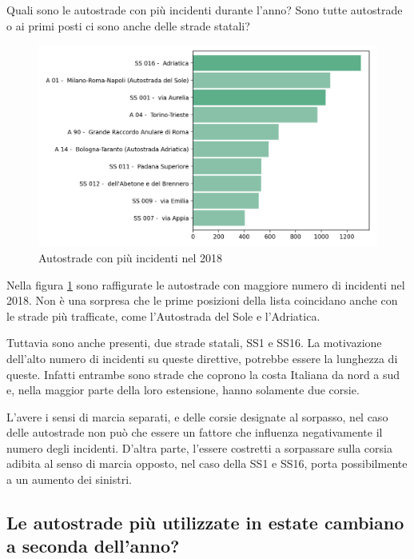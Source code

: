 \documentclass[a4paper,12pt]{report}
\begin{document}
Quali sono le autostrade con più incidenti durante l'anno? 
Sono tutte autostrade o ai primi posti ci sono anche delle strade statali? 

\begin{figure}
    \includegraphics[width=\linewidth]{../src/incidenti/incidenti_aci/autostrade/autostrade.png}
    \caption{Autostrade con più incidenti nel 2018}
    \label{fig:incidenti-autostrade}
\end{figure}

Nella figura \ref{fig:incidenti-autostrade} sono  raffigurate le autostrade con 
maggiore numero di incidenti nel 2018. 
Non è una sorpresa che le prime posizioni della lista coincidano 
anche con le strade più trafficate, come l'Autostrada del Sole e l'Adriatica.

Tuttavia sono anche presenti, due strade statali, SS1 e SS16. 
La motivazione dell'alto numero di incidenti su queste direttive, potrebbe essere 
la lunghezza di queste. Infatti entrambe sono strade che coprono la costa Italiana 
da nord a sud e, nella maggior parte della loro estensione, 
hanno solamente due corsie.

L'avere i sensi di marcia separati, e delle corsie designate al sorpasso, nel caso 
delle autostrade non può che essere un fattore che influenza negativamente 
il numero degli incidenti. 
D'altra parte, l'essere costretti a sorpassare sulla corsia adibita al senso di 
marcia opposto, nel caso della SS1 e SS16, porta possibilmente a un aumento dei 
sinistri.

\subsection{Le autostrade più utilizzate in estate cambiano a seconda dell'anno?}
\end{document}
